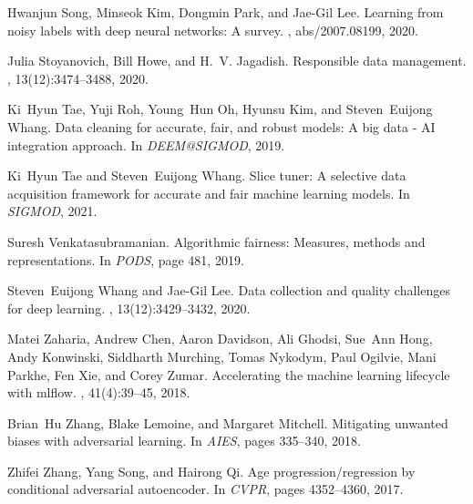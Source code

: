 \documentclass[11pt]{article}
\begin{document}
\begin{thebibliography}{10}
Hwanjun Song, Minseok Kim, Dongmin Park, and Jae{-}Gil Lee.
\newblock Learning from noisy labels with deep neural networks: {A} survey.
, abs/2007.08199, 2020.

Julia Stoyanovich, Bill Howe, and H.~V. Jagadish.
\newblock Responsible data management.
, 13(12):3474--3488, 2020.

Ki~Hyun Tae, Yuji Roh, Young~Hun Oh, Hyunsu Kim, and Steven~Euijong Whang.
\newblock Data cleaning for accurate, fair, and robust models: {A} big data -
  {AI} integration approach.
\newblock In {\em DEEM@SIGMOD}, 2019.

Ki~Hyun Tae and Steven~Euijong Whang.
\newblock Slice tuner: {A} selective data acquisition framework for accurate
  and fair machine learning models.
\newblock In {\em SIGMOD}, 2021.

Suresh Venkatasubramanian.
\newblock Algorithmic fairness: Measures, methods and representations.
\newblock In {\em PODS}, page 481, 2019.

Steven~Euijong Whang and Jae{-}Gil Lee.
\newblock Data collection and quality challenges for deep learning.
, 13(12):3429--3432, 2020.

Matei Zaharia, Andrew Chen, Aaron Davidson, Ali Ghodsi, Sue~Ann Hong, Andy
  Konwinski, Siddharth Murching, Tomas Nykodym, Paul Ogilvie, Mani Parkhe, Fen
  Xie, and Corey Zumar.
\newblock Accelerating the machine learning lifecycle with mlflow.
, 41(4):39--45, 2018.

Brian~Hu Zhang, Blake Lemoine, and Margaret Mitchell.
\newblock Mitigating unwanted biases with adversarial learning.
\newblock In {\em AIES}, pages 335--340, 2018.

Zhifei Zhang, Yang Song, and Hairong Qi.
\newblock Age progression/regression by conditional adversarial autoencoder.
\newblock In {\em CVPR}, pages 4352--4360, 2017.

\end{thebibliography}
\end{document}
